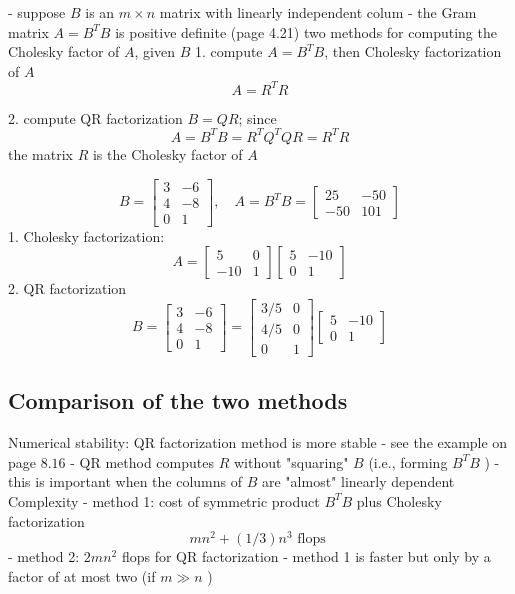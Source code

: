 - suppose $ B $ is an $ m \times n $ matrix with linearly independent colum
- the Gram matrix $ A=B^{T} B $ is positive definite (page 4.21)
two methods for computing the Cholesky factor of $ A $, given $ B $
1. compute $ A=B^{T} B $, then Cholesky factorization of $ A $
$$
A=R^{T} R
$$

2. compute QR factorization $ B=Q R $; since
$$
A=B^{T} B=R^{T} Q^{T} Q R=R^{T} R
$$
the matrix $ R $ is the Cholesky factor of $ A $

\begin{example}
    $$
B=\left[\begin{array}{rr}
3 & -6 \\
4 & -8 \\
0 & 1
\end{array}\right], \quad A=B^{T} B=\left[\begin{array}{rr}
25 & -50 \\
-50 & 101
\end{array}\right]
$$
1. Cholesky factorization:
$$
A=\left[\begin{array}{rr}
5 & 0 \\
-10 & 1
\end{array}\right]\left[\begin{array}{rr}
5 & -10 \\
0 & 1
\end{array}\right]
$$
2. QR factorization
$$
B=\left[\begin{array}{rr}
3 & -6 \\
4 & -8 \\
0 & 1
\end{array}\right]=\left[\begin{array}{rr}
3 / 5 & 0 \\
4 / 5 & 0 \\
0 & 1
\end{array}\right]\left[\begin{array}{rr}
5 & -10 \\
0 & 1
\end{array}\right]
$$
\end{example}

\subsection{Comparison of the two methods}

Numerical stability: QR factorization method is more stable
- see the example on page $ 8.16 $
- QR method computes $ R $ without "squaring" $ B $ (i.e., forming $ B^{T} B $ )
- this is important when the columns of $ B $ are "almost" linearly dependent
Complexity
- method 1: cost of symmetric product $ B^{T} B $ plus Cholesky factorization
$$
m n^{2}+(1 / 3) n^{3} \text { flops }
$$
- method 2: $ 2 m n^{2} $ flops for QR factorization
- method 1 is faster but only by a factor of at most two (if $ m \gg n $ )

